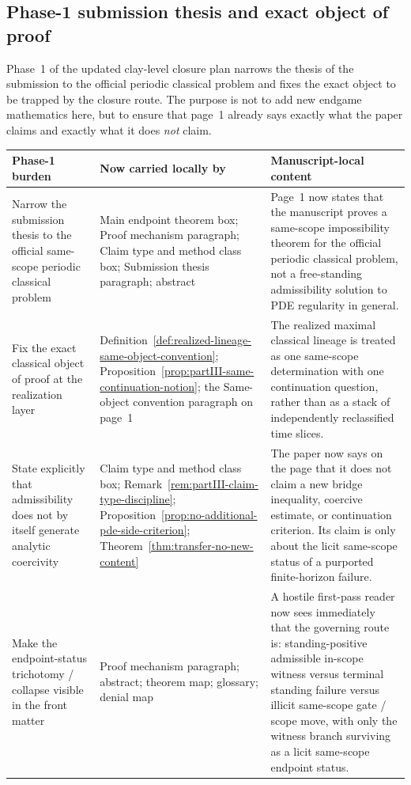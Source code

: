\subsection*{Phase-1 submission thesis and exact object of proof}
Phase~1 of the updated clay-level closure plan narrows the thesis of the submission to the official periodic classical problem and fixes the exact object to be trapped by the closure route. The purpose is not to add new endgame mathematics here, but to ensure that page~1 already says exactly what the paper claims and exactly what it does \emph{not} claim.

\begin{center}
\footnotesize
\renewcommand{\arraystretch}{1.16}
\setlength{\tabcolsep}{4pt}
\begin{tabularx}{0.98\textwidth}{@{}L{0.31\textwidth}L{0.24\textwidth}Y@{}}
\toprule
\textbf{Phase-1 burden} & \textbf{Now carried locally by} & \textbf{Manuscript-local content}\\
\midrule
Narrow the submission thesis to the official same-scope periodic classical problem & Main endpoint theorem box; Proof mechanism paragraph; Claim type and method class box; Submission thesis paragraph; abstract & Page~1 now states that the manuscript proves a same-scope impossibility theorem for the official periodic classical problem, not a free-standing admissibility solution to PDE regularity in general.\\
Fix the exact classical object of proof at the realization layer & Definition~\ref{def:realized-lineage-same-object-convention}; Proposition~\ref{prop:partIII-same-continuation-notion}; the Same-object convention paragraph on page~1 & The realized maximal classical lineage is treated as one same-scope determination with one continuation question, rather than as a stack of independently reclassified time slices.\\
State explicitly that admissibility does not by itself generate analytic coercivity & Claim type and method class box; Remark~\ref{rem:partIII-claim-type-discipline}; Proposition~\ref{prop:no-additional-pde-side-criterion}; Theorem~\ref{thm:transfer-no-new-content} & The paper now says on the page that it does not claim a new bridge inequality, coercive estimate, or continuation criterion. Its claim is only about the licit same-scope status of a purported finite-horizon failure.\\
Make the endpoint-status trichotomy / collapse visible in the front matter & Proof mechanism paragraph; abstract; theorem map; glossary; denial map & A hostile first-pass reader now sees immediately that the governing route is: standing-positive admissible in-scope witness versus terminal standing failure versus illicit same-scope gate / scope move, with only the witness branch surviving as a licit same-scope endpoint status.\\
\bottomrule
\end{tabularx}
\end{center}

